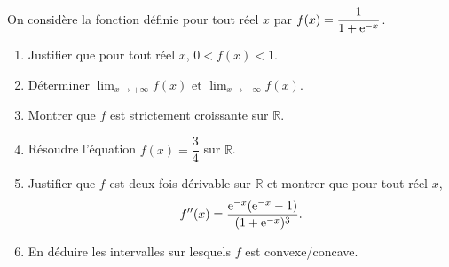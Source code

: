 \documentclass[11pt,fleqn, openany]{book} %
\begin{document}
\begin{exercise}[topic=cvx02]On considère la fonction définie pour tout réel $x$ par $f(x)=\dfrac{1}{1+\mathrm{e}^{-x}}$.
\begin{enumerate}
\item Justifier que pour tout réel $x$, $0<f(x)<1$.
\item Déterminer $\displaystyle \lim _{x \to +\infty}f(x)$ et $\displaystyle \lim _{x \to -\infty}f(x)$.
\item Montrer que $f$ est strictement croissante sur $\mathbb{R}$.
\item Résoudre l'équation $f(x)=\dfrac{3}{4}$ sur $\mathbb{R}$.
\item Justifier que $f$ est deux fois dérivable sur $\mathbb{R}$ et montrer que pour tout réel $x$,
\[f''(x) = \dfrac{\mathrm{e}^{-x}(\mathrm{e}^{-x}-1)}{(1+\mathrm{e}^{-x})^3}.\]
\item En déduire les intervalles sur lesquels $f$ est convexe/concave.
\end{enumerate}\end{exercise}
\end{document}
